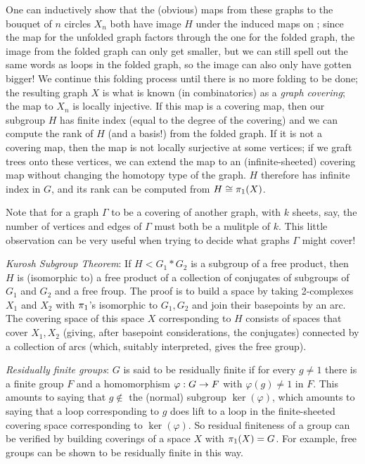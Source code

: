 One can inductively show that the (obvious)
maps from these graphs to the bouquet of $n$ circles $X_n$ both
have image $H$ under the induced maps on \mpu ; since the map 
for the unfolded graph
factors through the one for the folded graph, the image from the
folded graph can only get smaller, but we can still spell out
the same words as loops in the folded graph, so the image can
also only have gotten bigger! We continue this folding process until there
is no more folding to be done; the resulting graph $X$ is what is 
known (in combinatorics) as a {\it graph covering}; the map to $X_n$
is locally injective. If this map is a covering map, then our subgroup
$H$ has finite index (equal to the degree of the
covering) and we can compute the rank of $H$ (and a basis!) from the 
folded graph. If it is not a covering map, then the map is not locally surjective at
some vertices; if we graft trees onto these vertices, we can extend the map
to an (infinite-sheeted) covering map without changing the homotopy
type of the graph. $H$ therefore has infinite index in $G$, and its
rank can be computed from $H\cong \pi_1(X)$. 

\vfill
\eject

Note that for a graph $\Gamma$ to be a covering of another graph, with $k$ sheets, say,
the number of vertices and edges of $\Gamma$ must both be a mulitple of $k$. This
little observation can be very useful when trying to decide what graphs $\Gamma$ might
cover!

\msk

{\it Kurosh Subgroup Theorem}: If $H < G_1*G_2$ is a subgroup of
a free product, then $H$ is (isomorphic to) a free product of a
collection of conjugates of subgroups of $G_1$ and $G_2$ and a 
free froup. The proof is to build a space by taking 2-complexes
$X_1$ and $X_2$ with $\pi_1$'s isomorphic to $G_1,G_2$ and join
their basepoints by an arc. The covering space of this space $X$
corresponding to $H$ consists of spaces that cover $X_1,X_2$
(giving, after basepoint considerations, the conjugates)
connected by a collection of arcs (which, suitably interpreted,
gives the free group).

\msk

{\it Residually finite groups}: $G$ is said to be residually finite if for every $g\neq 1$ there is a 
finite group $F$ and a homomorphism $\varphi: G\rightarrow F$ with $\varphi(g)\neq 1$ in $F$. This 
amounts to saying that $g\notin$ the (normal) subgroup $\ker(\varphi)$, which amounts to
saying that a loop corresponding to $g$ does  lift to a loop in the finite-sheeted
covering space corresponding to $\ker(\varphi)$. So residual finiteness of a group can be
verified by building coverings of a space $X$ with $\pi_1(X)=G$. For example, free groups can be
shown to be residually finite in this way. 

